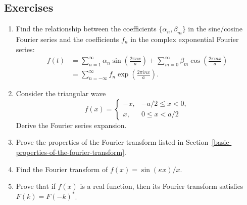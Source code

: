 \documentclass[10pt,a4paper]{article}
\begin{document}
\subsection{Exercises}\label{exercises}

\begin{enumerate}
\item
Find the relationship between the coefficients $\{\alpha_n, \beta_m\}$
in the sine/cosine Fourier series and the coefficients $f_n$ in the
complex exponential Fourier
series:
\begin{align}
  f(t) &= \sum_{n=1}^\infty \alpha_n \sin\left(\frac{2\pi n x}{a}\right) + \sum_{m=0}^\infty \beta_m \cos\left(\frac{2 \pi m x}{a}\right) \\ &= \sum_{n=-\infty}^\infty f_n \exp\left(\frac{2\pi i n x}{a}\right).
\end{align}

\item
  Consider the triangular wave
  \begin{equation}
    f(x) = \left\{\begin{array}{rr}- x, &-a/2 \le x < 0, \\ x, & 0 \le x < a/2\end{array}\right.
  \end{equation}
  Derive the Fourier series expansion.

\item
Prove the properties of the Fourier transform listed in
Section~\ref{basic-properties-of-the-fourier-transform}.

\item
  Find the Fourier transform of $f(x) = \sin(\kappa x)/x.$

\item
  Prove that if $f(x)$ is a real function, then its Fourier transform
  satisfies $F(k) = F(-k)^*$.
\end{enumerate}
\end{document}
